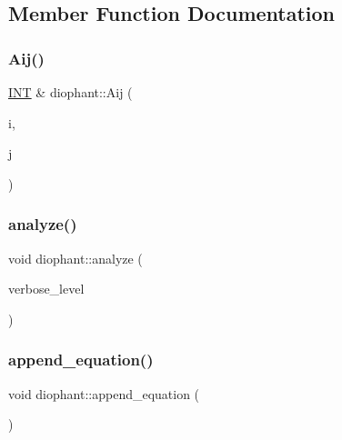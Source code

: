\subsection{Member Function Documentation}
\mbox{\label{classdiophant_af86d3bf833485e2f2d7b4a19288fc698}} 
\subsubsection{\texorpdfstring{Aij()}{Aij()}}
{\footnotesize\ttfamily \mbox{\hyperlink{galois_8h_a09fddde158a3a20bd2dcadb609de11dc}{I\+NT}} \& diophant\+::\+Aij (\begin{DoxyParamCaption}\item[{\mbox{\hyperlink{galois_8h_a09fddde158a3a20bd2dcadb609de11dc}{I\+NT}}}]{i,  }\item[{\mbox{\hyperlink{galois_8h_a09fddde158a3a20bd2dcadb609de11dc}{I\+NT}}}]{j }\end{DoxyParamCaption})}

\mbox{\label{classdiophant_a6548badaecf72d3ecb9989e9a3e518f0}} 
\subsubsection{\texorpdfstring{analyze()}{analyze()}}
{\footnotesize\ttfamily void diophant\+::analyze (\begin{DoxyParamCaption}\item[{\mbox{\hyperlink{galois_8h_a09fddde158a3a20bd2dcadb609de11dc}{I\+NT}}}]{verbose\+\_\+level }\end{DoxyParamCaption})}

\mbox{\label{classdiophant_ab0ddcea782ccecdabf75f2277c9e8bd1}} 
\subsubsection{\texorpdfstring{append\+\_\+equation()}{append\_equation()}}
{\footnotesize\ttfamily void diophant\+::append\+\_\+equation (\begin{DoxyParamCaption}{ }\end{DoxyParamCaption})}

